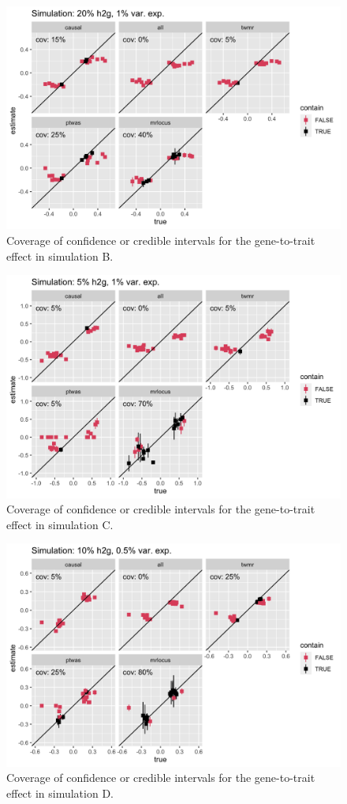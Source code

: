 \documentclass[11pt]{article}
\begin{document}
\begin{figure}[!ht]
  \centering
  \includegraphics[width=.8\textwidth]{figs/cover3.png}
  \caption{Coverage of confidence or credible intervals for the
    gene-to-trait effect in simulation B.}
\end{figure}

\begin{figure}[!ht]
  \centering
  \includegraphics[width=.8\textwidth]{figs/cover2.png}
  \caption{Coverage of confidence or credible intervals for the
    gene-to-trait effect in simulation C.}
\end{figure}

\begin{figure}[!ht]
  \centering
  \includegraphics[width=.8\textwidth]{figs/cover4.png}
  \caption{Coverage of confidence or credible intervals for the
    gene-to-trait effect in simulation D.}
\end{figure}
\end{document}
